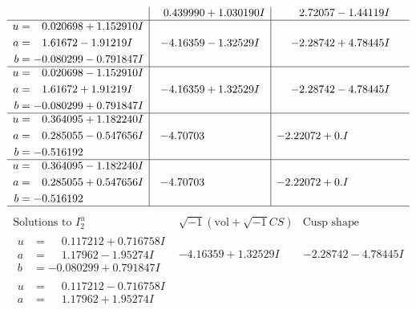 \documentclass[1p]{elsarticle_modified}
\theoremstyle{definition}
\newcommand{\I}{\sqrt{-1}}
\begin{document}
$$\begin{array}{c|c|c}
 & \phantom{-}0.439990 + 1.030190 I & \phantom{-}2.72057 - 1.44119 I \\ \hline\begin{aligned}
u &= \phantom{-}0.020698 + 1.152910 I \\
a &= \phantom{-}1.61672 - 1.91219 I \\
b &= -0.080299 - 0.791847 I\end{aligned}
 & -4.16359 - 1.32529 I & -2.28742 + 4.78445 I \\ \hline\begin{aligned}
u &= \phantom{-}0.020698 - 1.152910 I \\
a &= \phantom{-}1.61672 + 1.91219 I \\
b &= -0.080299 + 0.791847 I\end{aligned}
 & -4.16359 + 1.32529 I & -2.28742 - 4.78445 I \\ \hline\begin{aligned}
u &= \phantom{-}0.364095 + 1.182240 I \\
a &= \phantom{-}0.285055 - 0.547656 I \\
b &= -0.516192\phantom{ +0.000000I}\end{aligned}
 & -4.70703\phantom{ +0.000000I} & -2.22072 + 0. I\phantom{ +0.000000I} \\ \hline\begin{aligned}
u &= \phantom{-}0.364095 - 1.182240 I \\
a &= \phantom{-}0.285055 + 0.547656 I \\
b &= -0.516192\phantom{ +0.000000I}\end{aligned}
 & -4.70703\phantom{ +0.000000I} & -2.22072 + 0. I\phantom{ +0.000000I}\\
 \hline 
 \end{array}$$\newpage$$\begin{array}{c|c|c}  
\text{Solutions to }I^u_{2}& \I (\text{vol} + \sqrt{-1}CS) & \text{Cusp shape}\\
 \hline 
\begin{aligned}
u &= \phantom{-}0.117212 + 0.716758 I \\
a &= \phantom{-}1.17962 - 1.95274 I \\
b &= -0.080299 + 0.791847 I\end{aligned}
 & -4.16359 + 1.32529 I & -2.28742 - 4.78445 I \\ \hline\begin{aligned}
u &= \phantom{-}0.117212 - 0.716758 I \\
a &= \phantom{-}1.17962 + 1.95274 I \\

\end{aligned}
\end{array}$$
\end{document}
